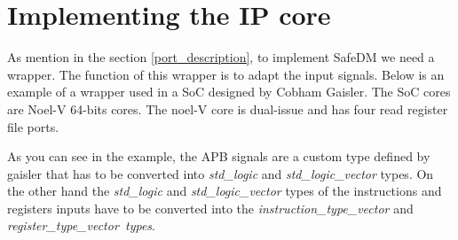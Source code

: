 \section{Implementing the IP core}
\label{implementation}

As mention in the section \ref{port_description}, to implement SafeDM we need a wrapper. The function of this wrapper is to adapt the input signals. Below is an example of a wrapper used in a SoC designed by Cobham Gaisler. The SoC cores are Noel-V 64-bits cores. The noel-V core is dual-issue and has four read register file ports.

As you can see in the example, the APB signals are a custom type defined by gaisler that has to be converted into \textit{std\_logic} and \textit{std\_logic\_vector} types. On the other hand the \textit{std\_logic} and \textit{std\_logic\_vector} types of the instructions and registers inputs have to be converted into the \textit{instruction\_type\_vector} and \textit{register\_type\_vector\ types}.


